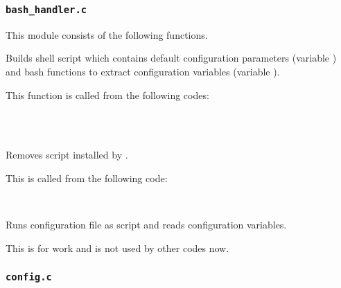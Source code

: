 \subsubsection{\texttt{bash\_handler.c}}

  This module consists of the following functions.
  
  
      Builds shell script which contains default configuration parameters
  	  (variable ) and bash functions to extract configuration
  	  variables (variable ).
      
      This function is called from the following codes:
      
      \FuncRefHdr
  		\\ \vspace{3pt}
  		\\ \hline
      \FuncRefTrailor
  
  
      Removes  script installed by .
      
      This is called from the following code:
      
      \FuncRefHdr
		  \\ \hline
      \FuncRefTrailor
  
  
  
      Runs configuration file as  script and reads configuration variables.
      
      This is for work and is not used by other codes now.



\subsubsection{\texttt{config.c}}

